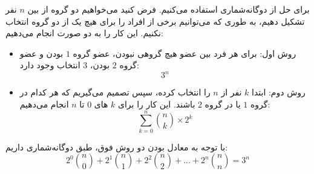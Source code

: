 \p
برای حل از دوگانه‌شماری استفاده می‌کنیم. 
 فرض کنید می‌خواهیم دو گروه از بین
$n$
نفر تشکیل دهیم، به طوری که می‌توانیم برخی از افراد را برای هیچ یک از دو گروه انتخاب نکنیم. 
این کار را به دو صورت انجام می‌دهیم:

\begin{itemize}
\item
روش اول:
       برای هر فرد بین عضو هیچ گروهی نبودن، عضو گروه 
$1$ 
        بودن و عضو گروه 
$2$ 
        بودن،
$3$ 
        انتخاب وجود دارد:
        $$3^n$$

\item     
روش دوم:
        ابتدا
$k$
         نفر از
$n$
          را انتخاب کرده، سپس تصمیم می‌گیریم که هر کدام در گروه 
$1$
         یا در گروه
$2$ 
    باشند. این کار را برای
$k$
         ‌های 
$0$ 
          تا
$n$ 
         انجام می‌دهیم:
        $$\sum_{k=0}^{n} {\binom{n}{k}\times2^k}$$

\end{itemize}
    با توجه به معادل بودن دو روش فوق، طبق دوگانه‌شماری داریم:
    $$2^0\binom{n}{0}+2^1\binom{n}{1}+2^2\binom{n}{2}+...+2^n\binom{n}{n}= 3^n$$